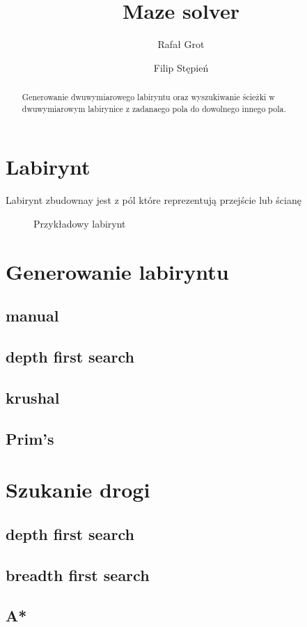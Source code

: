 \documentclass{article}
\title{Maze solver}
\author{Rafał Grot \and Filip Stępień}
\begin{document}
\maketitle

\begin{abstract}
  Generowanie dwuwymiarowego labiryntu oraz wyszukiwanie ścieżki w dwuwymiarowym labirynice z zadanaego pola do dowolnego innego pola.
\end{abstract}

\newcommand{\GridWidth}{8}   %
\newcommand{\GridHeight}{6}  %


\section{Labirynt}

Labirynt zbudownay jest z pól które reprezentują przejście lub ścianę

\begin{figure}[ht]
  \begin{center}
    
  \end{center}
  \caption{Przykładowy labirynt}
\end{figure}

\section{Generowanie labiryntu}
\subsection{manual}
\subsection{depth first search}
\subsection{krushal}
\subsection{Prim's}

\section{Szukanie drogi}
\subsection{depth first search}
\subsection{breadth first search}
\subsection{A*}
\end{document}
